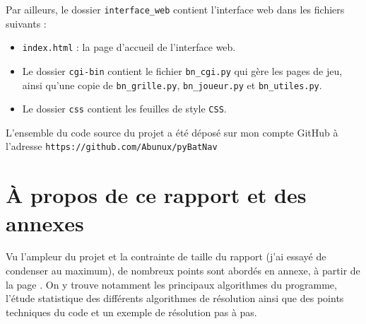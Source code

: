 \medskip

Par ailleurs, le dossier \texttt{interface\_web} contient l'interface web dans les fichiers suivants :
\begin{itemize}
\item \texttt{index.html} : la page d'accueil de l'interface web.
\item Le dossier \texttt{cgi-bin} contient le fichier \texttt{bn\_cgi.py} qui gère les pages de jeu, ainsi qu'une copie de \texttt{bn\_grille.py}, \texttt{bn\_joueur.py} et \texttt{bn\_utiles.py}.
\item Le dossier \texttt{css} contient les feuilles de style \texttt{CSS}.
\end{itemize}

\bigskip

L'ensemble du code source du projet a été déposé sur mon compte GitHub à l'adresse \texttt{https://github.com/Abunux/pyBatNav}

\section{À propos de ce rapport et des annexes}
Vu l'ampleur du projet et la contrainte de taille du rapport (j'ai essayé de condenser au maximum), de nombreux points sont abordés en annexe, à partir de la page \pageref{annexes}. On y trouve notamment les principaux algorithmes du programme, l'étude statistique des différents algorithmes de résolution ainsi que des points techniques du code et un exemple de résolution pas à pas.
